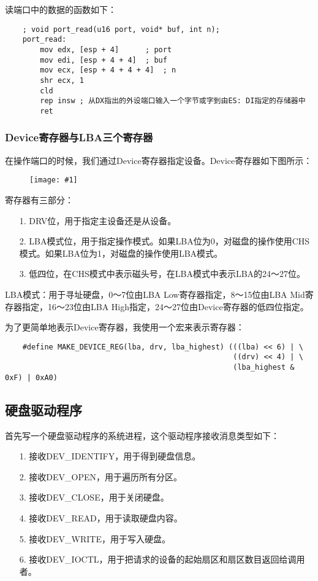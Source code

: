\documentclass[a4paper,left=2.5cm,right=2.5cm,11pt]{article}
\newcommand{\fic}[1]{\begin{figure}[H]
		\center
		\texttt{[image: \#1]}
	\end{figure}}
\begin{document}
	读端口中的数据的函数如下：
	\begin{lstlisting}
	; void port_read(u16 port, void* buf, int n);
	port_read:
		mov	edx, [esp + 4]		; port
		mov	edi, [esp + 4 + 4]	; buf
		mov	ecx, [esp + 4 + 4 + 4]	; n
		shr	ecx, 1
		cld
		rep	insw ; 从DX指出的外设端口输入一个字节或字到由ES: DI指定的存储器中
		ret
	\end{lstlisting}

\subsubsection{Device寄存器与LBA三个寄存器}
	在操作端口的时候，我们通过Device寄存器指定设备。Device寄存器如下图所示：
	\fic{2.png}

	寄存器有三部分：
	\begin{itemize}
		\item[1.] DRV位，用于指定主设备还是从设备。
		\item[2.] LBA模式位，用于指定操作模式。如果LBA位为0，对磁盘的操作使用CHS模式。如果LBA位为1，对磁盘的操作使用LBA模式。
		\item[3.] 低四位，在CHS模式中表示磁头号，在LBA模式中表示LBA的24～27位。
	\end{itemize}

	LBA模式：用于寻址硬盘，0～7位由LBA Low寄存器指定，8～15位由LBA Mid寄存器指定，16～23位由LBA High指定，24～27位由Device寄存器的低四位指定。\par

	为了更简单地表示Device寄存器，我使用一个宏来表示寄存器：
	\begin{lstlisting}
	#define MAKE_DEVICE_REG(lba, drv, lba_highest) (((lba) << 6) | \
							                        ((drv) << 4) | \
													(lba_highest & 0xF) | 0xA0)
	\end{lstlisting}

	

\subsection{硬盘驱动程序}
	首先写一个硬盘驱动程序的系统进程，这个驱动程序接收消息类型如下：
	\begin{itemize}
		\item[1.] 接收DEV\_IDENTIFY，用于得到硬盘信息。
		\item[2.] 接收DEV\_OPEN，用于遍历所有分区。
		\item[3.] 接收DEV\_CLOSE，用于关闭硬盘。
		\item[4.] 接收DEV\_READ，用于读取硬盘内容。
		\item[5.] 接收DEV\_WRITE，用于写入硬盘。
		\item[6.] 接收DEV\_IOCTL，用于把请求的设备的起始扇区和扇区数目返回给调用者。
	\end{itemize}
\end{document}
